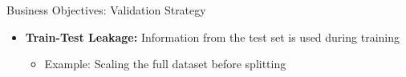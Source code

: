 \documentclass[10pt,compress,t,notes=noshow, xcolor=table]{beamer}
\begin{document}
\begin{frame}{Business Objectives: Validation Strategy}
{\begin{itemize}
  \item \textbf{Train-Test Leakage:} Information from the test set is used during training
    \begin{itemize}
      \item Example: Scaling the full dataset before splitting
    \end{itemize}
\end{itemize}
}
\end{frame}








\end{document}
